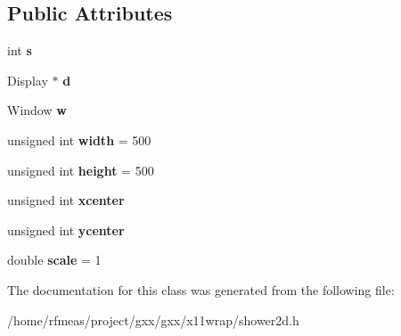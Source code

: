 \subsection*{Public Attributes}
\begin{DoxyCompactItemize}
\item 
int {\bfseries s}\hypertarget{classgxx_1_1shower2d_aef6c50bce0c74f4bdd21c3d250c74f43}{}\label{classgxx_1_1shower2d_aef6c50bce0c74f4bdd21c3d250c74f43}

\item 
Display $\ast$ {\bfseries d}\hypertarget{classgxx_1_1shower2d_ab281407bdd9012ca8411858cc720fdbd}{}\label{classgxx_1_1shower2d_ab281407bdd9012ca8411858cc720fdbd}

\item 
Window {\bfseries w}\hypertarget{classgxx_1_1shower2d_a53e4765c3ee67c6dd439fc88c9392802}{}\label{classgxx_1_1shower2d_a53e4765c3ee67c6dd439fc88c9392802}

\item 
unsigned int {\bfseries width} = 500\hypertarget{classgxx_1_1shower2d_a1a73d37058226a7ea6e60735be2df96d}{}\label{classgxx_1_1shower2d_a1a73d37058226a7ea6e60735be2df96d}

\item 
unsigned int {\bfseries height} = 500\hypertarget{classgxx_1_1shower2d_aa664830c4b4f90ab1369eae0f1e5b16d}{}\label{classgxx_1_1shower2d_aa664830c4b4f90ab1369eae0f1e5b16d}

\item 
unsigned int {\bfseries xcenter}\hypertarget{classgxx_1_1shower2d_a015e1f846c9f16e8e50bdb4118f6bdbf}{}\label{classgxx_1_1shower2d_a015e1f846c9f16e8e50bdb4118f6bdbf}

\item 
unsigned int {\bfseries ycenter}\hypertarget{classgxx_1_1shower2d_a8ac692cd910217fc6d005fb261d40c31}{}\label{classgxx_1_1shower2d_a8ac692cd910217fc6d005fb261d40c31}

\item 
double {\bfseries scale} = 1\hypertarget{classgxx_1_1shower2d_a6586ed8f8ef3db1b2fbf655906a9cc04}{}\label{classgxx_1_1shower2d_a6586ed8f8ef3db1b2fbf655906a9cc04}

\end{DoxyCompactItemize}


The documentation for this class was generated from the following file\+:\begin{DoxyCompactItemize}
\item 
/home/rfmeas/project/gxx/gxx/x11wrap/shower2d.\+h\end{DoxyCompactItemize}

